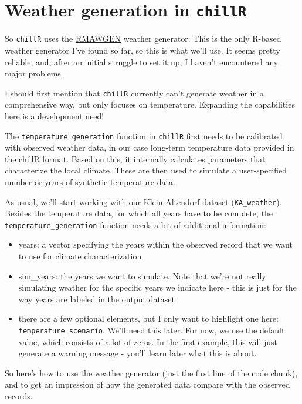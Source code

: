 \documentclass[
]{book}
\providecommand{\tightlist}{%
  \setlength{\itemsep}{0pt}\setlength{\parskip}{0pt}}
\begin{document}
\hypertarget{weather-generation-in-chillr}{%
\section{\texorpdfstring{Weather generation in \texttt{chillR}}{Weather generation in chillR}}\label{weather-generation-in-chillr}}

So \texttt{chillR} uses the \href{https://cran.r-project.org/web/packages/RMAWGEN/index.html}{RMAWGEN} weather generator. This is the only R-based weather generator I've found so far, so this is what we'll use. It seems pretty reliable, and, after an initial struggle to set it up, I haven't encountered any major problems.

I should first mention that \texttt{chillR} currently can't generate weather in a comprehensive way, but only focuses on temperature. Expanding the capabilities here is a development need!

The \texttt{temperature\_generation} function in \texttt{chillR} first needs to be calibrated with observed weather data, in our case long-term temperature data provided in the chillR format. Based on this, it internally calculates parameters that characterize the local climate. These are then used to simulate a user-specified number or years of synthetic temperature data.

As usual, we'll start working with our Klein-Altendorf dataset (\texttt{KA\_weather}). Besides the temperature data, for which all years have to be complete, the \texttt{temperature\_generation} function needs a bit of additional information:

\begin{itemize}
\tightlist
\item
  years: a vector specifying the years within the observed record that we want to use for climate characterization
\item
  sim\_years: the years we want to simulate. Note that we're not really simulating weather for the specific years we indicate here - this is just for the way years are labeled in the output dataset
\item
  there are a few optional elements, but I only want to highlight one here: \texttt{temperature\_scenario}. We'll need this later. For now, we use the default value, which consists of a lot of zeros. In the first example, this will just generate a warning message - you'll learn later what this is about.
\end{itemize}

So here's how to use the weather generator (just the first line of the code chunk), and to get an impression of how the generated data compare with the observed records.
\end{document}
